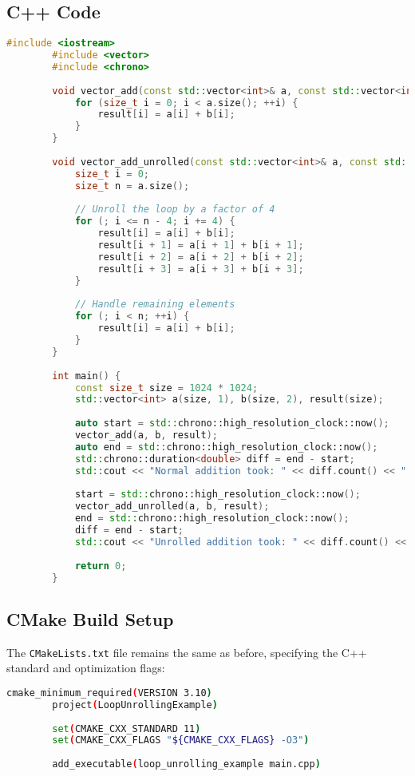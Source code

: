 \documentclass{article}
\begin{document}
	\subsection{C++ Code}
	\begin{lstlisting}[language=C++, caption={Loop Unrolling Example}]
		#include <iostream>
		#include <vector>
		#include <chrono>
		
		void vector_add(const std::vector<int>& a, const std::vector<int>& b, std::vector<int>& result) {
			for (size_t i = 0; i < a.size(); ++i) {
				result[i] = a[i] + b[i];
			}
		}
		
		void vector_add_unrolled(const std::vector<int>& a, const std::vector<int>& b, std::vector<int>& result) {
			size_t i = 0;
			size_t n = a.size();
			
			// Unroll the loop by a factor of 4
			for (; i <= n - 4; i += 4) {
				result[i] = a[i] + b[i];
				result[i + 1] = a[i + 1] + b[i + 1];
				result[i + 2] = a[i + 2] + b[i + 2];
				result[i + 3] = a[i + 3] + b[i + 3];
			}
			
			// Handle remaining elements
			for (; i < n; ++i) {
				result[i] = a[i] + b[i];
			}
		}
		
		int main() {
			const size_t size = 1024 * 1024;
			std::vector<int> a(size, 1), b(size, 2), result(size);
			
			auto start = std::chrono::high_resolution_clock::now();
			vector_add(a, b, result);
			auto end = std::chrono::high_resolution_clock::now();
			std::chrono::duration<double> diff = end - start;
			std::cout << "Normal addition took: " << diff.count() << " s\n";
			
			start = std::chrono::high_resolution_clock::now();
			vector_add_unrolled(a, b, result);
			end = std::chrono::high_resolution_clock::now();
			diff = end - start;
			std::cout << "Unrolled addition took: " << diff.count() << " s\n";
			
			return 0;
		}
	\end{lstlisting}
	
	\subsection{CMake Build Setup}
	The \texttt{CMakeLists.txt} file remains the same as before, specifying the C++ standard and optimization flags:
	
	\begin{lstlisting}[language=Bash, caption={CMake Configuration}]
		cmake_minimum_required(VERSION 3.10)
		project(LoopUnrollingExample)
		
		set(CMAKE_CXX_STANDARD 11)
		set(CMAKE_CXX_FLAGS "${CMAKE_CXX_FLAGS} -O3")
		
		add_executable(loop_unrolling_example main.cpp)
	\end{lstlisting}
	
\end{document}
